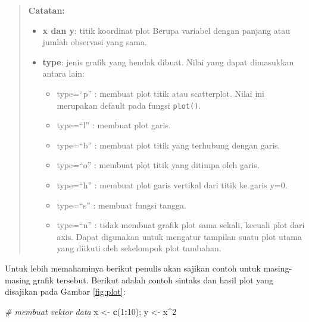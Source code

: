 \documentclass[]{book}
\newenvironment{Shaded}{\begin{snugshade}}{\end{snugshade}}
\newcommand{\CommentTok}[1]{\textcolor[rgb]{0.56,0.35,0.01}{\textit{#1}}}
\newcommand{\DecValTok}[1]{\textcolor[rgb]{0.00,0.00,0.81}{#1}}
\newcommand{\KeywordTok}[1]{\textcolor[rgb]{0.13,0.29,0.53}{\textbf{#1}}}
\newcommand{\NormalTok}[1]{#1}
\newcommand{\OperatorTok}[1]{\textcolor[rgb]{0.81,0.36,0.00}{\textbf{#1}}}
\newcommand{\StringTok}[1]{\textcolor[rgb]{0.31,0.60,0.02}{#1}}
\providecommand{\tightlist}{%
  \setlength{\itemsep}{0pt}\setlength{\parskip}{0pt}}
\theoremstyle{definition}
\theoremstyle{definition}
\theoremstyle{definition}
\theoremstyle{remark}
\begin{document}
\begin{quote}
\textbf{Catatan:}

\begin{itemize}
\tightlist
\item
  \textbf{x dan y}: titik koordinat plot Berupa variabel dengan panjang atau jumlah observasi yang sama.
\item
  \textbf{type}: jenis grafik yang hendak dibuat. Nilai yang dapat dimasukkan antara lain:

  \begin{itemize}
  \tightlist
  \item
    type=``p'' : membuat plot titik atau scatterplot. Nilai ini merupakan default pada fungsi \texttt{plot()}.
  \item
    type=``l'' : membuat plot garis.
  \item
    type=``b'' : membuat plot titik yang terhubung dengan garis.
  \item
    type=``o'' : membuat plot titik yang ditimpa oleh garis.
  \item
    type=``h'' : membuat plot garis vertikal dari titik ke garis y=0.
  \item
    type=``s'' : membuat fungsi tangga.
  \item
    type=``n'' : tidak membuat grafik plot sama sekali, kecuali plot dari axis. Dapat digunakan untuk mengatur tampilan suatu plot utama yang diikuti oleh sekelompok plot tambahan.
  \end{itemize}
\end{itemize}
\end{quote}

Untuk lebih memahaminya berikut penulis akan sajikan contoh untuk masing-masing grafik tersebut. Berikut adalah contoh sintaks dan hasil plot yang disajikan pada Gambar \ref{fig:plot}:

\begin{Shaded}
\begin{Highlighting}[]
\CommentTok{# membuat vektor data }
\NormalTok{x <-}\StringTok{ }\KeywordTok{c}\NormalTok{(}\DecValTok{1}\OperatorTok{:}\DecValTok{10}\NormalTok{); y <-}\StringTok{ }\NormalTok{x}\OperatorTok{^}\DecValTok{2}
\end{Highlighting}
\end{Shaded}
\end{document}
